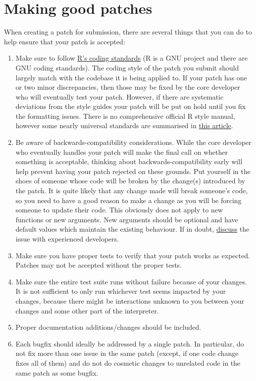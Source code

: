 \documentclass[
]{book}
\begin{document}
\hypertarget{GoodPatches}{%
\section{Making good patches}\label{GoodPatches}}

When creating a patch for submission, there are several things that you can do to help ensure that your patch is accepted:

\begin{enumerate}
\def\labelenumi{\arabic{enumi}.}
\item
  Make sure to follow \href{https://cran.r-project.org/doc/manuals/r-release/R-ints.html\#R-coding-standards}{R's coding standards} (R is a GNU project and there are GNU coding standards). The coding style of the patch you submit should largely match with the codebase it is being applied to. If your patch has one or two minor discrepancies, then those may be fixed by the core developer who will eventually test your patch. However, if there are systematic deviations from the style guides your patch will be put on hold until you fix the formatting issues. There is no comprehensive official R style manual, however some nearly universal standards are summarised in \href{https://cran.r-project.org/web/packages/rockchalk/vignettes/Rstyle.pdf}{this article}.
\item
  Be aware of backwards-compatibility considerations. While the core developer who eventually handles your patch will make the final call on whether something is acceptable, thinking about backwards-compatibility early will help prevent having your patch rejected on these grounds. Put yourself in the shoes of someone whose code will be broken by the change(s) introduced by the patch. It is quite likely that any change made will break someone's code, so you need to have a good reason to make a change as you will be forcing someone to update their code. This obviously does not apply to new functions or new arguments. New arguments should be optional and have default values which maintain the existing behaviour. If in doubt, \protect\hyperlink{WhereToGetHelp}{discuss} the issue with experienced developers.
\item
  Make sure you have proper tests to verify that your patch works as expected. Patches may not be accepted without the proper tests.
\item
  Make sure the entire test suite runs without failure because of your changes. It is not sufficient to only run whichever test seems impacted by your changes, because there might be interactions unknown to you between your changes and some other part of the interpreter.
\item
  Proper documentation additions/changes should be included.
\item
  Each bugfix should ideally be addressed by a single patch. In particular, do not fix more than one issue in the same patch (except, if one code change fixes all of them) and do not do cosmetic changes to unrelated code in the same patch as some bugfix.
\end{enumerate}
\end{document}
